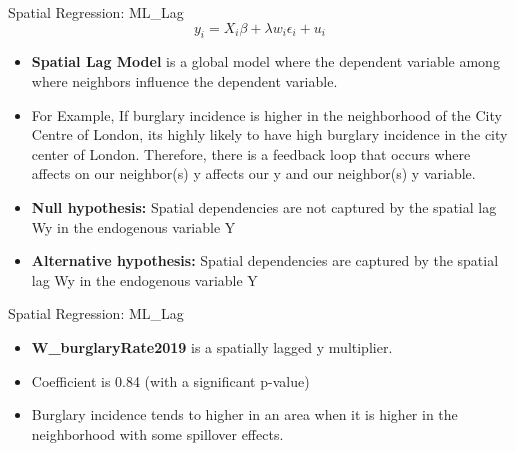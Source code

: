 \documentclass[10pt, aspectratio=169]{beamer}
\begin{document}
\begin{frame}{Spatial Regression: ML\_Lag}
    \begin{equation} 
        y_i=X_i \beta+\lambda w_i \epsilon_i+u_i
    \end{equation}
    \begin{itemize}
         
        \item \textbf{Spatial Lag Model} is a global model where the dependent variable among where neighbors influence the dependent variable. 
        \item \textbf{}For Example, If burglary incidence is higher in the neighborhood of the City Centre of London, its highly likely to have high burglary incidence in the city center of London. Therefore, there is a feedback loop that occurs where affects on our neighbor(s) y affects our y and our neighbor(s) y variable.
        \item \textbf{Null hypothesis:} Spatial dependencies are not captured by the spatial lag Wy in the endogenous variable Y
        \item \textbf{Alternative hypothesis:} Spatial dependencies are captured by the spatial lag Wy in the endogenous variable Y
        
    \end{itemize}
\end{frame}

\begin{frame}{Spatial Regression: ML\_Lag}
    \small\begin{table}[!h]
        
        \caption{\label{tab:ml_lag_summary} Estimation results of ML\_Lag regression.}
    \end{table}
    \begin{itemize}
         
        \item \textbf{W\_burglaryRate2019} is a spatially lagged y multiplier. 
        \item \textbf{} Coefficient is 0.84 (with a significant p-value)
        \item \textbf{} Burglary incidence tends to higher in an area when it is higher in the neighborhood with some spillover effects.  
        
    \end{itemize}
\end{frame}
\end{document}
